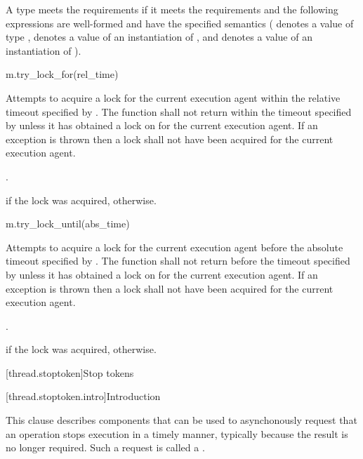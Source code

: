 \pnum
A type  meets the  requirements if it meets the 
requirements and the following expressions are well-formed and have the specified semantics
( denotes a value of type ,  denotes a value of an
instantiation of , and  denotes a value
of an instantiation of ).

\begin{itemdecl}
m.try_lock_for(rel_time)
\end{itemdecl}

\begin{itemdescr}
\pnum
\effects Attempts to acquire a lock for the current execution agent within the relative
timeout specified by . The function shall not return
within the timeout specified by  unless it has obtained a lock on 
for the current execution agent. If an exception is thrown then a lock shall not have been
acquired for the current execution agent.

\pnum
\returntype {}.

\pnum
\returns {} if the lock was acquired,  otherwise.
\end{itemdescr}

\begin{itemdecl}
m.try_lock_until(abs_time)
\end{itemdecl}

\begin{itemdescr}
\pnum
\effects Attempts to acquire a lock for the current execution agent before the absolute
timeout specified by . The function shall not return
before the timeout specified by  unless it has obtained a lock on  for
the current execution agent. If an exception is thrown then a lock shall not have been acquired
for the current execution agent.

\pnum
\returntype {}.

\pnum
\returns {} if the lock was acquired,  otherwise.
\end{itemdescr}

[thread.stoptoken]{Stop tokens}

[thread.stoptoken.intro]{Introduction}

\pnum
This clause describes components that can be used
to asynchonously request that an operation stops execution in a timely manner,
typically because the result is no longer required.
Such a request is called a .

